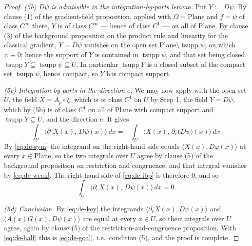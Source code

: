 \begin{proof}
\emph{(5b) $D\psi$ is admissible in the integration-by-parts lemma.}  Put $Y:=D\psi$.  By
clause (1) of the gradient-field proposition, applied with $\Omega=\mathrm{Plane}$ and $f=\psi$
of class $C^{\infty}$ there, $Y$ is of class $C^{\infty}$ --- hence of class $C^{1}$ --- on all
of $\mathrm{Plane}$.  By clause (3) of the background proposition on the product rule and
linearity for the classical gradient, $Y=D\psi$ vanishes on the open set
$\mathrm{Plane}\setminus\operatorname{tsupp}\psi$, on which $\psi\equiv0$; hence the support of
$Y$ is contained in $\operatorname{tsupp}\psi$, and that set being closed,
$\operatorname{tsupp}Y\subseteq\operatorname{tsupp}\psi\subseteq U$.  In particular
$\operatorname{tsupp}Y$ is a closed subset of the compact set $\operatorname{tsupp}\psi$, hence
compact, so $Y$ has compact support.

\emph{(5c) Integration by parts in the direction $e$.}  We may now apply
 with the open set $U$, the field $X=A_p\circ\xi$, which
is of class $C^{1}$ on $U$ by Step 1, the field $Y=D\psi$, which by (5b) is of class $C^{1}$ on
all of $\mathrm{Plane}$ with compact support and $\operatorname{tsupp}Y\subseteq U$, and the
direction $e$.  It gives
\begin{equation}\label{eq:de-ibp}
  \int_U\bigl\langle\partial_eX(x),\,D\psi(x)\bigr\rangle\,dx
  =-\int_U\bigl\langle X(x),\,\partial_e\bigl(D\psi\bigr)(x)\bigr\rangle\,dx .
\end{equation}
By \eqref{eq:de-sym} the integrand on the right-hand side equals
$\langle X(x),D\varphi(x)\rangle$ at every $x\in\mathrm{Plane}$, so the two integrals over $U$
agree by clause (5) of the background proposition on restriction and congruence; and that
integral vanishes by \eqref{eq:de-weak}.  The right-hand side of \eqref{eq:de-ibp} is therefore
$0$, and so
\begin{equation}\label{eq:de-half}
  \int_U\bigl\langle\partial_eX(x),\,D\psi(x)\bigr\rangle\,dx=0 .
\end{equation}

\emph{(5d) Conclusion.}  By \eqref{eq:de-key} the integrands
$\langle\partial_eX(x),D\psi(x)\rangle$ and $\langle A(x)G(x),D\psi(x)\rangle$ are equal at
every $x\in U$, so their integrals over $U$ agree, again by clause (5) of the
restriction-and-congruence proposition.  With \eqref{eq:de-half} this is \eqref{eq:de-goal},
i.e.\ condition (5), and the proof is complete.
\end{proof}
